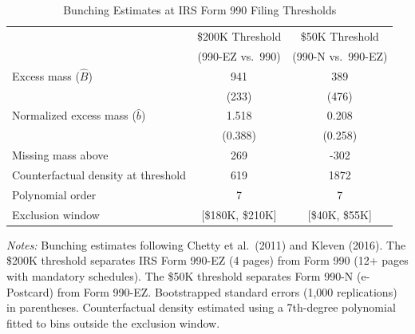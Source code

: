 \begin{table}[htbp]
\centering
\caption{Bunching Estimates at IRS Form 990 Filing Thresholds}
\label{tab:bunching}
\begin{tabular}{lcc}
\hline\hline
 & \$200K Threshold & \$50K Threshold \\
 & (990-EZ vs.\ 990) & (990-N vs.\ 990-EZ) \\
\hline
Excess mass ($\hat{B}$) & 941 & 389 \\
 & (233) & (476) \\
\addlinespace
Normalized excess mass ($\hat{b}$) & 1.518 & 0.208 \\
 & (0.388) & (0.258) \\
\addlinespace
Missing mass above & 269 & -302 \\
Counterfactual density at threshold & 619 & 1872 \\
Polynomial order & 7 & 7 \\
Exclusion window & [\$180K, \$210K] & [\$40K, \$55K] \\
\hline\hline
\end{tabular}
\begin{tablenotes}
\item \textit{Notes:} Bunching estimates following Chetty et al.\ (2011) and Kleven (2016). The \$200K threshold separates IRS Form 990-EZ (4 pages) from Form 990 (12+ pages with mandatory schedules). The \$50K threshold separates Form 990-N (e-Postcard) from Form 990-EZ. Bootstrapped standard errors (1,000 replications) in parentheses. Counterfactual density estimated using a 7th-degree polynomial fitted to bins outside the exclusion window.
\end{tablenotes}
\end{table}
